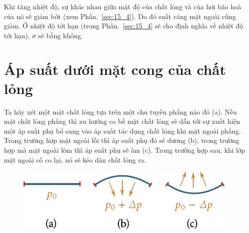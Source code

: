 Khi tăng nhiệt độ, sự khác nhau giữa mật độ của chất lỏng và của hơi bão hoà của nó sẽ giảm bớt (xem Phần.~\ref{sec:15_4}). Do đó suất căng mặt ngoài cũng giảm. Ở nhiệt độ tới hạn (trong Phần.~\ref{sec:15_4} sẽ cho định nghĩa về nhiệt độ tới hạn), $\sigma$ sẽ bằng không.


\section{Áp suất dưới mặt cong của chất lỏng}\label{sec:14_3}


Ta hãy xét một mặt chất lỏng tựa trên một chu tuyến phẳng nào đó (a). Nếu mặt chất lỏng phẳng thì xu hướng co bề mặt chất lỏng sẽ dẫn tới sự xuất hiện một áp suất phụ bổ sung vào áp suất tác dụng chất lỏng khi mặt ngoài phẳng. Trong trường hợp mặt ngoài lồi thì áp suất phụ đó sẽ dương (b), trong trường hợp mà mặt ngoài lõm thì áp suất phụ sẽ âm (c). Trong trường hợp sau, khi lớp mặt ngoài cố co lại, nó sẽ kéo dãn chất lỏng ra.

\begin{figure}[!htb]
	\begin{center}
		\includegraphics[scale=1.1]{figures/ch_14/fig_14_3.pdf}
		\caption[]{}
		\label{fig:14_3}
	\end{center}
	\vspace{-0.8cm}
\end{figure}

